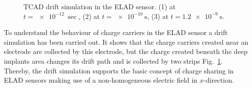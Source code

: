 \begin{figure}[t]
\begin{minipage}[h]{0.24\linewidth}
 \end{minipage}
 \begin{minipage}[h]{0.24\linewidth}
 \end{minipage}
\caption[short description here]
  {TCAD drift simulation in the ELAD sensor. (1) at $t = \SI{e-12}{\sec}$, (2) at $t = \SI{e-10}{\s}$, (3) at $t = \SI{1.2e-9}{\s}$.}
\label{fig:drift}
\end{figure} %

To understand the behaviour of charge carriers in the ELAD sensor a drift simulation has been carried out. 
It shows that the charge carriers created near an electrode are collected by this electrode, but the charge created beneath the deep implants area %
 changes its drift path and is collected by two strips Fig.~\ref{fig:drift}.  
Thereby, the drift simulation supports the basic concept of charge sharing in ELAD sensors making use of a non-homogeneous electric field in $x$-direction. 


 